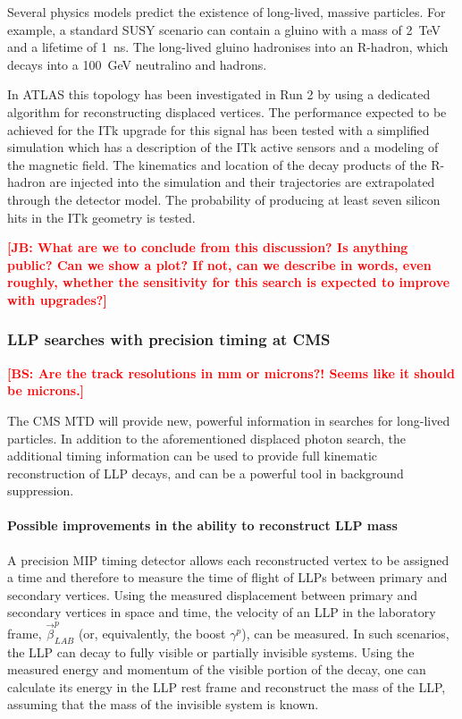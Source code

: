 Several physics models predict the existence of long-lived, massive particles. For example, a standard SUSY scenario can contain a gluino with a mass of 2~TeV and a lifetime of 1~ns. The long-lived gluino hadronises into an R-hadron, which decays into a 100~GeV neutralino and hadrons.

In ATLAS this topology has been investigated in Run 2 by using a dedicated algorithm for reconstructing displaced vertices. The performance expected to be achieved for the ITk upgrade for this signal has been tested with a simplified simulation which has a description of the ITk active sensors and a modeling of the magnetic field. The kinematics and location of the decay products of the R-hadron are injected into the simulation and their trajectories are extrapolated through the detector model. The probability of producing at least seven silicon hits in the ITk geometry is tested.

{\bf \textcolor{red}{[JB: What are we to conclude from this discussion?  Is anything public?  Can we show a plot?  If not, can we describe in words, even roughly, whether the sensitivity for this search is expected to improve with upgrades?]}}

\subsubsection{LLP searches with precision timing at CMS}

{\bf \textcolor{red}{[BS: Are the track resolutions in mm or microns?! Seems like it should be microns.]}}

The CMS MTD will provide new, powerful information in searches for long-lived particles. In addition to the aforementioned displaced photon search, the additional timing information can be used to provide full kinematic reconstruction of LLP decays, and can be a powerful tool in background suppression. 

\paragraph{Possible improvements in the ability to reconstruct LLP mass}

A precision MIP timing detector allows each reconstructed vertex to be assigned a time and therefore to measure the time of flight of LLPs between primary and secondary vertices. Using the measured displacement between primary and secondary vertices in space and time, the velocity of an LLP in the laboratory frame, $\vec{\beta}_{LAB}^{p}$ (or, equivalently, the boost $\gamma^p$), can be measured. In such scenarios, the LLP can decay to fully visible or partially invisible systems. Using the measured energy and momentum of the visible portion of the decay, one can calculate its energy in the LLP rest frame and reconstruct the mass of the LLP, assuming that the mass of the invisible system is known.

